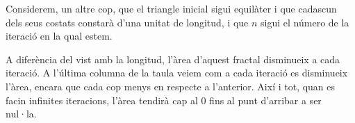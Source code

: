 \documentclass[12pt]{report}
\begin{document}
Considerem, un altre cop, que el triangle inicial sigui equilàter i que cadascun dels seus costats constarà d'una unitat de longitud, i que $n$ sigui el número de la iteració en la qual estem.
\newline
\newline
\newline
\hspace{-2em}
\newline

A diferència del vist amb la longitud, l'àrea d'aquest fractal disminueix a cada iteració. A l'última columna de la taula veiem com a cada iteració es disminueix l'àrea, encara que cada cop menys en respecte a l'anterior. Així i tot, quan es facin infinites iteracions, l'àrea tendirà cap al 0 fins al punt d'arribar a ser nul·la.
\end{document}
